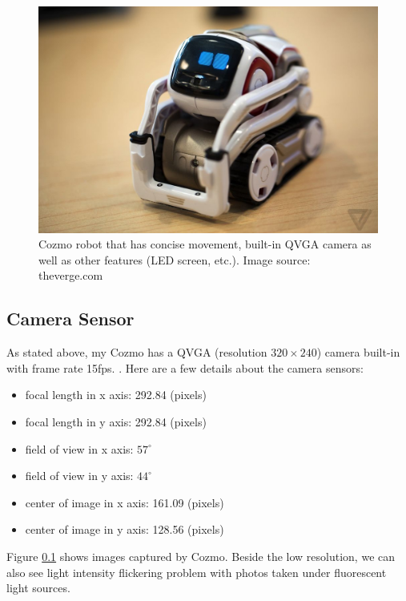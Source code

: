 \begin{figure}[!htb]
	\centering
	\includegraphics[width=0.8\hsize]{./figures/cozmo}
	\caption{Cozmo robot that has concise movement, built-in QVGA camera as well as other features (LED screen, etc.). Image source: theverge.com}
	\label{fig:cozmo}
\end{figure}

\subsection{Camera Sensor}
 As stated above, my Cozmo has a QVGA (resolution $320 \times 240$) camera built-in with frame rate 15fps. . Here are a few details about the camera sensors:
 \begin{itemize}
 	\item focal length in x axis: 292.84 (pixels)
 	\item focal length in y axis: 292.84 (pixels)
 	\item field of view in x axis: $57^{\circ}$
 	\item field of view in y axis: $44^{\circ}$
 	\item center of image in x axis: 161.09 (pixels)
 	\item center of image in y axis: 128.56 (pixels)
 \end{itemize}
Figure \ref{} shows images captured by Cozmo. Beside the low resolution, we can also see light intensity flickering problem with photos taken under fluorescent light sources.

